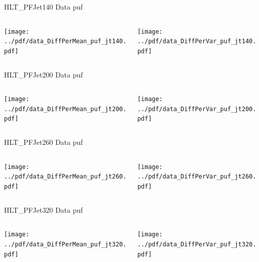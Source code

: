 \documentclass[9pt]{beamer}
\begin{document}
\begin{frame}[t]{HLT\_PFJet140 Data puf}
\begin{columns}[T]
  \begin{column}{.5\textwidth}
  \texttt{[image: ../pdf/data\_DiffPerMean\_puf\_jt140.pdf]}
  \end{column}
  \begin{column}{.5\textwidth}
  \texttt{[image: ../pdf/data\_DiffPerVar\_puf\_jt140.pdf]}
  \end{column}
\end{columns}
\end{frame}

\begin{frame}[t]{HLT\_PFJet200 Data puf}
\begin{columns}[T]
  \begin{column}{.5\textwidth}
  \texttt{[image: ../pdf/data\_DiffPerMean\_puf\_jt200.pdf]}
  \end{column}
  \begin{column}{.5\textwidth}
  \texttt{[image: ../pdf/data\_DiffPerVar\_puf\_jt200.pdf]}
  \end{column}
\end{columns}
\end{frame}

\begin{frame}[t]{HLT\_PFJet260 Data puf}
\begin{columns}[T]
  \begin{column}{.5\textwidth}
  \texttt{[image: ../pdf/data\_DiffPerMean\_puf\_jt260.pdf]}
  \end{column}
  \begin{column}{.5\textwidth}
  \texttt{[image: ../pdf/data\_DiffPerVar\_puf\_jt260.pdf]}
  \end{column}
\end{columns}
\end{frame}

\begin{frame}[t]{HLT\_PFJet320 Data puf}
\begin{columns}[T]
  \begin{column}{.5\textwidth}
  \texttt{[image: ../pdf/data\_DiffPerMean\_puf\_jt320.pdf]}
  \end{column}
  \begin{column}{.5\textwidth}
  \texttt{[image: ../pdf/data\_DiffPerVar\_puf\_jt320.pdf]}
  \end{column}
\end{columns}
\end{frame}
\end{document}
